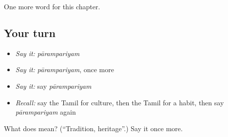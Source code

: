 \begin{grammarlens}[title={What you've built}]
One more word for this chapter.
\end{grammarlens}

\subsection*{Your turn}
\begin{itemize}
\raggedright
  \item \emph{Say it:} \emph{pārampariyam}
  \item \emph{Say it:} \emph{pārampariyam}, once more
  \item \emph{Say it:} say \emph{pārampariyam}
  \item \emph{Recall:} say the Tamil for culture, then the Tamil for a habit, then say \emph{pārampariyam} again
\end{itemize}

\begin{tcolorbox}[breakable,colback=teal!4,colframe=teal!35!black,title={Before you move on}]
What does  mean? (\textquotedblleft{}Tradition, heritage\textquotedblright{}.) Say it once more.
\end{tcolorbox}
